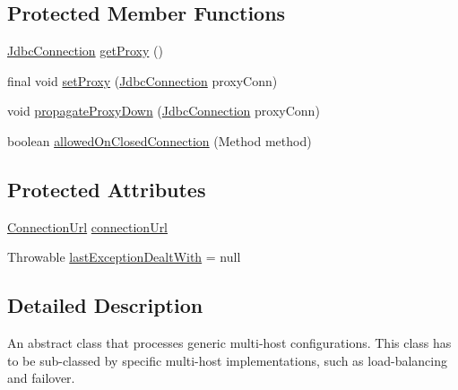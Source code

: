 \subsection*{Protected Member Functions}
\begin{DoxyCompactItemize}
\item 
\mbox{\hyperlink{interfacecom_1_1mysql_1_1cj_1_1jdbc_1_1_jdbc_connection}{Jdbc\+Connection}} \mbox{\hyperlink{classcom_1_1mysql_1_1cj_1_1jdbc_1_1ha_1_1_multi_host_connection_proxy_a89beece2de4d34030d58a90a40ac5c9f}{get\+Proxy}} ()
\item 
final void \mbox{\hyperlink{classcom_1_1mysql_1_1cj_1_1jdbc_1_1ha_1_1_multi_host_connection_proxy_a14df65af9560d49c9ee1f9c3ea2da376}{set\+Proxy}} (\mbox{\hyperlink{interfacecom_1_1mysql_1_1cj_1_1jdbc_1_1_jdbc_connection}{Jdbc\+Connection}} proxy\+Conn)
\item 
void \mbox{\hyperlink{classcom_1_1mysql_1_1cj_1_1jdbc_1_1ha_1_1_multi_host_connection_proxy_a290e636d680ff120338e9d781cbb33c1}{propagate\+Proxy\+Down}} (\mbox{\hyperlink{interfacecom_1_1mysql_1_1cj_1_1jdbc_1_1_jdbc_connection}{Jdbc\+Connection}} proxy\+Conn)
\item 
boolean \mbox{\hyperlink{classcom_1_1mysql_1_1cj_1_1jdbc_1_1ha_1_1_multi_host_connection_proxy_a0abd1b79ee2ab0d89e01c95f1dc53197}{allowed\+On\+Closed\+Connection}} (Method method)
\end{DoxyCompactItemize}
\subsection*{Protected Attributes}
\begin{DoxyCompactItemize}
\item 
\mbox{\hyperlink{classcom_1_1mysql_1_1cj_1_1conf_1_1_connection_url}{Connection\+Url}} \mbox{\hyperlink{classcom_1_1mysql_1_1cj_1_1jdbc_1_1ha_1_1_multi_host_connection_proxy_aae3d1ff31056ba5a6686ce6e692a64a8}{connection\+Url}}
\item 
Throwable \mbox{\hyperlink{classcom_1_1mysql_1_1cj_1_1jdbc_1_1ha_1_1_multi_host_connection_proxy_a8d7e0a7a6f8dcdee3099f3e1c8c2f59a}{last\+Exception\+Dealt\+With}} = null
\end{DoxyCompactItemize}


\subsection{Detailed Description}
An abstract class that processes generic multi-\/host configurations. This class has to be sub-\/classed by specific multi-\/host implementations, such as load-\/balancing and failover. 

